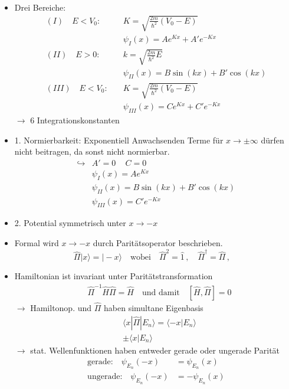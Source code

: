 \documentclass[10pt,article,colorback,accentcolor=tud9d]{scrartcl}
\begin{document}
    \begin{itemize}
      \item Drei Bereiche:
        \begin{align}
          (I) \quad E<V_0: \quad &K=\sqrt{\frac{2m}{\hbar^2}(V_0-E)}\\
          &\psi_I(x)=Ae^{Kx}+A'e^{-Kx}\\
          (II) \quad E>0: \quad &k=\sqrt{\frac{2m}{\hbar^2}E}\\
          &\psi_{II}(x)=B\sin(kx)+B'\cos(kx)\\
          (III) \quad E<V_0: \quad &K=\sqrt{\frac{2m}{\hbar^2}(V_0-E)}\\
          &\psi_{III}(x)=Ce^{Kx}+C'e^{-Kx}
        \end{align}
        $\rightarrow$ 6 Integrationskonstanten
      \item 1. Normierbarkeit: Exponentiell Anwachsenden Terme für $x\rightarrow \pm \infty$ dürfen nicht beitragen, da sonst nicht normierbar.
        \begin{align}
          \hookrightarrow &A'=0 \, \quad C=0\\
          &\psi_I(x)=Ae^{Kx}\\
          &\psi_{II}(x)=B\sin(kx)+B'\cos(kx)\\
          &\psi_{III}(x)=C'e^{-Kx}
        \end{align}
      \item 2. Potential symmetrisch unter $x\rightarrow-x$
      \item Formal wird $x\rightarrow-x$ durch Paritätsoperator beschrieben.
        \begin{equation}
        \hat{\Pi}|x\rangle=|-x\rangle \quad \text{wobei} \quad \hat{\Pi}^2=\hat{1} \, , \quad \hat{\Pi}^\dagger=\hat{\Pi} \, , \quad
        \end{equation}
      \item Hamiltonian ist invariant unter Paritätstransformation
        \begin{align}
          &\hat{\Pi}^{-1}\hat{H}\hat{\Pi}=\hat{H} \quad \text{und damit} \quad [\hat{H},\hat{\Pi}]=0
        \end{align}
        $\rightarrow$ Hamiltonop. und $\hat{\Pi}$ haben simultane Eigenbasis
        \begin{align}
        &\langle x|\hat{\Pi}|E_n\rangle=\langle-x|E_n\rangle\\
        &\pm\langle x|E_n\rangle
        \end{align}
        $\rightarrow$ stat. Wellenfunktionen haben entweder gerade oder ungerade Parität
        \begin{align}
        \text{gerade:}\quad \psi_{E_n}(-x)&=\psi_{E_n}(x)\\
        \text{ungerade:}\quad \psi_{E_n}(-x)&=-\psi_{E_n}(x)
        \end{align}
    \end{itemize}
 
\end{document}
